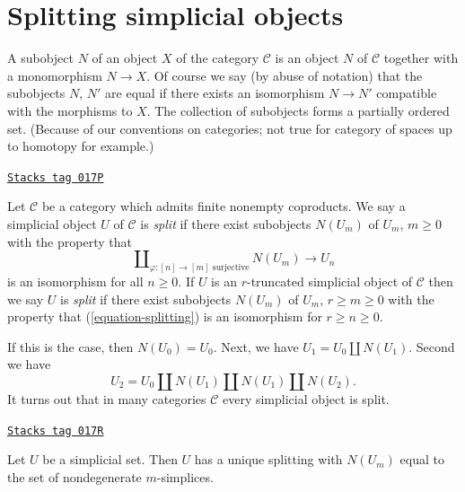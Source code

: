 \section{Splitting simplicial objects}
\label{simplicial-section-splitting}
A subobject $N$ of an object $X$ of the category $\mathcal{C}$
is an object $N$ of $\mathcal{C}$ together with a monomorphism
$N \to X$. Of course we say (by abuse of notation) that
the subobjects $N$, $N'$ are equal if there exists an isomorphism
$N \to N'$ compatible with the morphisms to $X$. The collection
of subobjects forms a partially ordered set. (Because of our
conventions on categories; not true for category of spaces
up to homotopy for example.)

\begin{definition}[Split]
\label{simplicial-definition-split}
\href{https://stacks.math.columbia.edu/tag/017P}{\texttt{Stacks tag 017P}}

Let $\mathcal{C}$ be a category which admits finite nonempty coproducts.
We say a simplicial object $U$ of $\mathcal{C}$ is {\it split}
if there exist subobjects $N(U_m)$ of $U_m$, $m \geq 0$
with the property that
\begin{equation}
\label{equation-splitting}
\coprod\nolimits_{\varphi : [n] \to [m]\text{ surjective}}
N(U_m)
\longrightarrow
U_n
\end{equation}
is an isomorphism for all $n \geq 0$. If $U$ is an $r$-truncated
simplicial object of $\mathcal{C}$ then we say $U$ is {\it split}
if there exist subobjects $N(U_m)$ of $U_m$, $r \geq m \geq 0$
with the property that (\ref{equation-splitting})
is an isomorphism for $r \geq n \geq 0$.
\end{definition}

If this is the case, then $N(U_0) = U_0$. Next, we have
$U_1 = U_0 \amalg N(U_1)$. Second we have
$$
U_2 = U_0 \amalg N(U_1) \amalg N(U_1) \amalg N(U_2).
$$
It turns out that in many categories $\mathcal{C}$
every simplicial object is split.

\begin{lemma}
\label{simplicial-lemma-splitting-simplicial-sets}
\href{https://stacks.math.columbia.edu/tag/017R}{\texttt{Stacks tag 017R}}

Let $U$ be a simplicial set. Then $U$ has a unique splitting
with $N(U_m)$ equal to the set of nondegenerate $m$-simplices.
\end{lemma}

